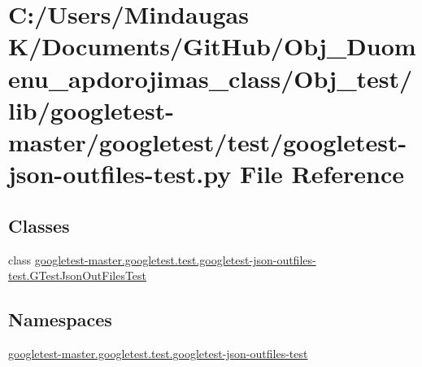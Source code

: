 \hypertarget{_obj__test_2lib_2googletest-master_2googletest_2test_2googletest-json-outfiles-test_8py}{}\section{C\+:/\+Users/\+Mindaugas K/\+Documents/\+Git\+Hub/\+Obj\+\_\+\+Duomenu\+\_\+apdorojimas\+\_\+class/\+Obj\+\_\+test/lib/googletest-\/master/googletest/test/googletest-\/json-\/outfiles-\/test.py File Reference}
\label{_obj__test_2lib_2googletest-master_2googletest_2test_2googletest-json-outfiles-test_8py}
\subsection*{Classes}
\begin{DoxyCompactItemize}
\item 
class \mbox{\hyperlink{classgoogletest-master_1_1googletest_1_1test_1_1googletest-json-outfiles-test_1_1_g_test_json_out_files_test}{googletest-\/master.\+googletest.\+test.\+googletest-\/json-\/outfiles-\/test.\+G\+Test\+Json\+Out\+Files\+Test}}
\end{DoxyCompactItemize}
\subsection*{Namespaces}
\begin{DoxyCompactItemize}
\item 
 \mbox{\hyperlink{namespacegoogletest-master_1_1googletest_1_1test_1_1googletest-json-outfiles-test}{googletest-\/master.\+googletest.\+test.\+googletest-\/json-\/outfiles-\/test}}
\end{DoxyCompactItemize}
